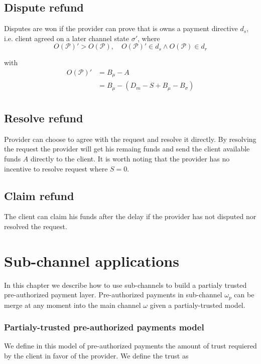 \documentclass{llncs}
\begin{document}
\subsection{Dispute refund} Disputes are won if the provider can prove that is owns a payment directive $d_s$, i.e. client agreed on a later channel state $\sigma'$, where
$$O(\mathcal{P})' > O(\mathcal{P}), \quad O(\mathcal{P})' \in d_s \land O(\mathcal{P}) \in d_r$$

with
\begin{equation*}
\begin{split}
    O(\mathcal{P})' &= B_\mu - A \\
    &= B_\mu - (D_m - S + B_\mu - B_\sigma) \\
\end{split}
\end{equation*}

\subsection{Resolve refund} Provider can choose to agree with the request and resolve it directly. By resolving the request the provider will get his remaing funds and send the client available funds $A$ directly to the client. It is worth noting that the provider has no incentive to resolve request where $S = 0$.

\subsection{Claim refund} The client can claim his funds after the delay if the provider has not disputed nor resolved the request.

\section{Sub-channel applications} In this chapter we describe how to use sub-channels to build a partialy trusted pre-authorized payment layer. Pre-authorized payments in sub-channel $\omega_p$ can be merge at any moment into the main channel $\omega$ given a partialy-trusted model.

\subsubsection{Partialy-trusted pre-authorized payments model} We define in this model of pre-authorized payments the amount of trust requiered by the client in favor of the provider. We define the trust as
\end{document}
